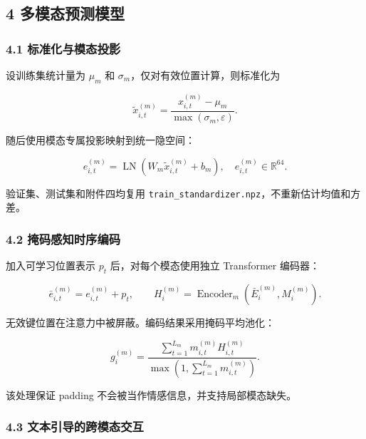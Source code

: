 \documentclass[
  12pt,
  a4paper,
]{ctexart}
\begin{document}
\hypertarget{ux591aux6a21ux6001ux9884ux6d4bux6a21ux578b}{%
\subsection{4
多模态预测模型}\label{ux591aux6a21ux6001ux9884ux6d4bux6a21ux578b}}

\hypertarget{ux6807ux51c6ux5316ux4e0eux6a21ux6001ux6295ux5f71}{%
\subsubsection{4.1
标准化与模态投影}\label{ux6807ux51c6ux5316ux4e0eux6a21ux6001ux6295ux5f71}}

设训练集统计量为 \(\mu_m\) 和 \(\sigma_m\)，仅对有效位置计算，则标准化为

\[
\widetilde{x}_{i,t}^{(m)}=\frac{x_{i,t}^{(m)}-\mu_m}{\max(\sigma_m,\varepsilon)}.
\tag{3}
\]

随后使用模态专属投影映射到统一隐空间：

\[
e_{i,t}^{(m)}=\operatorname{LN}(W_m\widetilde{x}_{i,t}^{(m)}+b_m),\quad e_{i,t}^{(m)}\in\mathbb R^{64}.
\tag{4}
\]

验证集、测试集和附件四均复用
\texttt{train\_standardizer.npz}，不重新估计均值和方差。

\hypertarget{ux63a9ux7801ux611fux77e5ux65f6ux5e8fux7f16ux7801}{%
\subsubsection{4.2
掩码感知时序编码}\label{ux63a9ux7801ux611fux77e5ux65f6ux5e8fux7f16ux7801}}

加入可学习位置表示 \(p_t\) 后，对每个模态使用独立 Transformer 编码器：

\[
\bar e_{i,t}^{(m)}=e_{i,t}^{(m)}+p_t,
\qquad H_i^{(m)}=\operatorname{Encoder}_m(\bar E_i^{(m)},M_i^{(m)}).
\tag{5}
\]

无效键位置在注意力中被屏蔽。编码结果采用掩码平均池化：

\[
g_i^{(m)}=\frac{\sum_{t=1}^{L_m}m_{i,t}^{(m)}H_{i,t}^{(m)}}{\max(1,\sum_{t=1}^{L_m}m_{i,t}^{(m)})}.
\tag{6}
\]

该处理保证 padding 不会被当作情感信息，并支持局部模态缺失。

\hypertarget{ux6587ux672cux5f15ux5bfcux7684ux8de8ux6a21ux6001ux4ea4ux4e92}{%
\subsubsection{4.3
文本引导的跨模态交互}\label{ux6587ux672cux5f15ux5bfcux7684ux8de8ux6a21ux6001ux4ea4ux4e92}}
\end{document}
